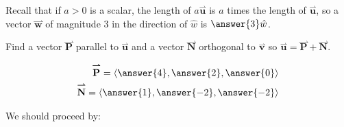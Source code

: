 \documentclass{ximera}
\begin{document}
\begin{exercise}
\begin{hint}
Recall that if $a>0$ is a scalar, the length of $a\overset{\boldsymbol{\rightharpoonup}}{\mathbf{u}}$ is $a$ times the length of $\overset{\boldsymbol{\rightharpoonup}}{\mathbf{u}}$, so a vector $\overset{\boldsymbol{\rightharpoonup}}{\mathbf{w}}$ of magnitude 3 in the direction of $\hat{w}$ is $\answer{3}\hat{w}$. 
\end{hint}

\begin{exercise}
Find a vector $\overset{\boldsymbol{\rightharpoonup}}{\mathbf{P}}$ parallel to $\overset{\boldsymbol{\rightharpoonup}}{\mathbf{u}}$ and a vector $\overset{\boldsymbol{\rightharpoonup}}{\mathbf{N}}$ orthogonal to $\overset{\boldsymbol{\rightharpoonup}}{\mathbf{v}}$ so $\overset{\boldsymbol{\rightharpoonup}}{\mathbf{u}} = \overset{\boldsymbol{\rightharpoonup}}{\mathbf{P}} +\overset{\boldsymbol{\rightharpoonup}}{\mathbf{N}}$.

\begin{align*}
\overset{\boldsymbol{\rightharpoonup}}{\mathbf{P}} = \left< \answer{4},\answer{2}, \answer{0} \right> \\
\overset{\boldsymbol{\rightharpoonup}}{\mathbf{N}} = \left< \answer{1},\answer{-2},\answer{-2} \right> \\
\end{align*} 

\begin{hint}
 We should proceed by:
 
 \begin{multipleChoice}
 \end{multipleChoice}
 \end{hint}
 
  \end{exercise}
\end{exercise}
\end{document}
